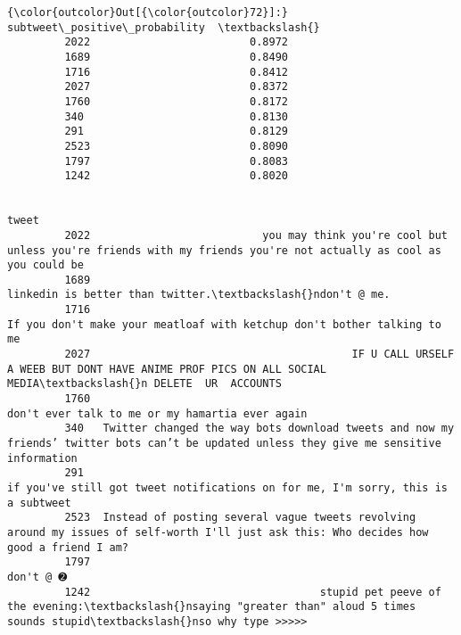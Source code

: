 \documentclass[11pt]{article}
\begin{document}
\begin{Verbatim}[commandchars=\\\{\}]
{\color{outcolor}Out[{\color{outcolor}72}]:}       subtweet\_positive\_probability  \textbackslash{}
         2022                         0.8972   
         1689                         0.8490   
         1716                         0.8412   
         2027                         0.8372   
         1760                         0.8172   
         340                          0.8130   
         291                          0.8129   
         2523                         0.8090   
         1797                         0.8083   
         1242                         0.8020   
         
                                                                                                                                                  tweet  
         2022                           you may think you're cool but unless you're friends with my friends you're not actually as cool as you could be  
         1689                                                                                             linkedin is better than twitter.\textbackslash{}ndon't @ me.  
         1716                                                                   If you don't make your meatloaf with ketchup don't bother talking to me  
         2027                                         IF U CALL URSELF A WEEB BUT DONT HAVE ANIME PROF PICS ON ALL SOCIAL MEDIA\textbackslash{}n DELETE  UR  ACCOUNTS   
         1760                                                                                           don't ever talk to me or my hamartia ever again  
         340   Twitter changed the way bots download tweets and now my friends’ twitter bots can’t be updated unless they give me sensitive information  
         291                                                           if you've still got tweet notifications on for me, I'm sorry, this is a subtweet  
         2523  Instead of posting several vague tweets revolving around my issues of self-worth I'll just ask this: Who decides how good a friend I am?  
         1797                                                                                                                                 don't @ ➋  
         1242                                    stupid pet peeve of the evening:\textbackslash{}nsaying "greater than" aloud 5 times sounds stupid\textbackslash{}nso why type >>>>>  
\end{Verbatim}
            
\end{document}
